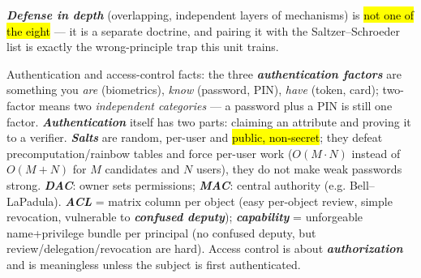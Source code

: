 \documentclass[12pt, a4paper]{article}
\newcommand{\term}[1]{\textbf{\textit{#1}}}        %
\newcommand{\imp}[1]{\hl{#1}}                       %
\begin{document}
\term{Defense in depth} (overlapping, independent layers of mechanisms) is \imp{not one of the eight} --- it is a separate doctrine, and pairing it with the Saltzer--Schroeder list is exactly the wrong-principle trap this unit trains.

Authentication and access-control facts: the three \term{authentication factors} are something you \emph{are} (biometrics), \emph{know} (password, PIN), \emph{have} (token, card); two-factor means two \emph{independent categories} --- a password plus a PIN is still one factor. \term{Authentication} itself has two parts: claiming an attribute and proving it to a verifier. \term{Salts} are random, per-user and \imp{public, non-secret}; they defeat precomputation/rainbow tables and force per-user work ($O(M\cdot N)$ instead of $O(M+N)$ for $M$ candidates and $N$ users), they do not make weak passwords strong. \term{DAC}: owner sets permissions; \term{MAC}: central authority (e.g. Bell--LaPadula). \term{ACL} = matrix column per object (easy per-object review, simple revocation, vulnerable to \term{confused deputy}); \term{capability} = unforgeable name+privilege bundle per principal (no confused deputy, but review/delegation/revocation are hard). Access control is about \term{authorization} and is meaningless unless the subject is first authenticated.
\end{document}
